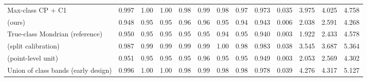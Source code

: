 \begin{table}[!htbp]
{\begin{tabular}{lcccccccccccc}
Max-class CP + C1 & 0.997 & 1.00 & 1.00 & 0.98 & 0.99 & 0.98 & 0.97 & 0.973 & 0.035 & 3.975 & 4.025 & 4.758 \\
\gamut{} (ours) & 0.948 & 0.95 & 0.95 & 0.96 & 0.96 & 0.95 & 0.94 & 0.943 & 0.006 & 2.038 & 2.591 & 4.268 \\
True-class Mondrian (reference) & 0.950 & 0.95 & 0.95 & 0.95 & 0.95 & 0.94 & 0.95 & 0.940 & 0.003 & 1.922 & 2.433 & 4.578 \\
\gamut{} (split calibration) & 0.987 & 0.99 & 0.99 & 0.99 & 0.99 & 1.00 & 0.98 & 0.983 & 0.038 & 3.545 & 3.687 & 5.364 \\
\gamut{} (point-level unit) & 0.951 & 0.95 & 0.95 & 0.95 & 0.96 & 0.95 & 0.95 & 0.949 & 0.003 & 2.053 & 2.569 & 4.302 \\
Union of class bands (early design) & 0.996 & 1.00 & 1.00 & 0.98 & 0.99 & 0.98 & 0.98 & 0.978 & 0.039 & 4.276 & 4.317 & 5.127 \\
\bottomrule
\end{tabular}}
\end{table}
\FloatBarrier

